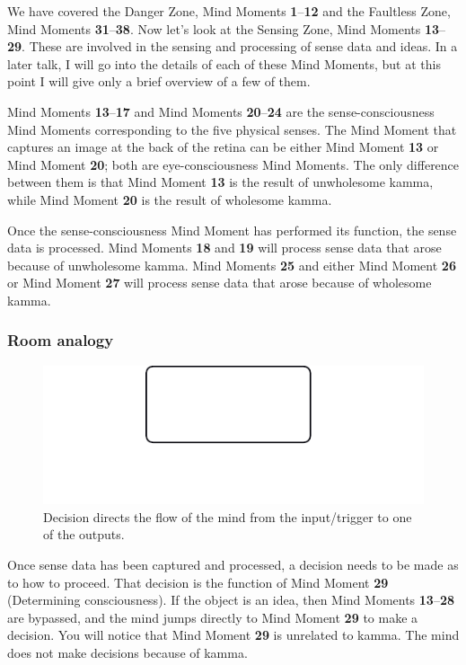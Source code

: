 We have covered the Danger Zone, Mind Moments \textbf{1}--\textbf{12} and the Faultless Zone, Mind Moments \textbf{31}--\textbf{38}. Now let’s look at the Sensing Zone, Mind Moments \textbf{13}--\textbf{29}. These are involved in the sensing and processing of sense data and ideas. In a later talk, I will go into the details of each of these Mind Moments, but at this point I will give only a brief overview of a few of them.

Mind Moments \textbf{13}--\textbf{17} and Mind Moments \textbf{20}--\textbf{24} are the sense-consciousness Mind Moments corresponding to the five physical senses. The Mind Moment that captures an image at the back of the retina can be either Mind Moment \textbf{13} or Mind Moment \textbf{20}; both are eye-consciousness Mind Moments. The only difference between them is that Mind Moment \textbf{13} is the result of unwholesome kamma, while Mind Moment \textbf{20} is the result of wholesome kamma.

Once the sense-consciousness Mind Moment has performed its function, the sense data is processed. Mind Moments \textbf{18} and \textbf{19} will process sense data that arose because of unwholesome kamma. Mind Moments \textbf{25} and either Mind Moment \textbf{26} or Mind Moment \textbf{27} will process sense data that arose because of wholesome kamma.

\pagebreak
\subsubsection*{Room analogy}

\begin{figure}[H]
\centering
\includegraphics[width=0.4\linewidth]{./Diagrams/Room}
\caption{Decision directs the flow of the mind from the input/trigger to one of the outputs.}
\label{fig:Room}
\end{figure}

Once sense data has been captured and processed, a decision needs to be made as to how to proceed. That decision is the function of Mind Moment \textbf{29} (Determining consciousness). If the object is an idea, then Mind Moments \textbf{13}--\textbf{28} are bypassed, and the mind jumps directly to Mind Moment \textbf{29} to make a decision. You will notice that Mind Moment \textbf{29} is unrelated to kamma. The mind does not make decisions because of kamma.


